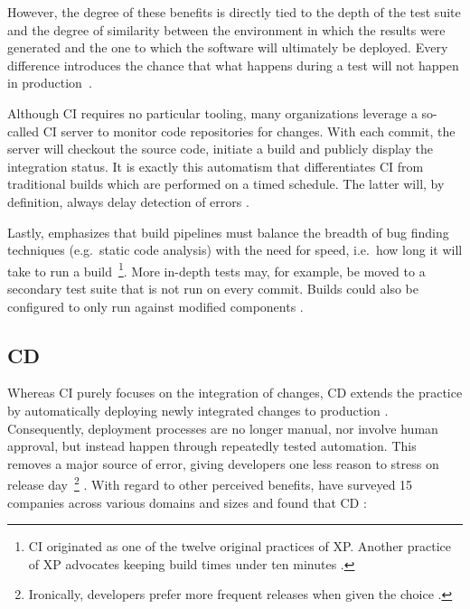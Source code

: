 \begin{appendices}
However, the degree of these benefits is directly tied to the depth of the test suite and the degree of similarity between the environment in which the results were generated and the one to which the software will ultimately be deployed. Every difference introduces the chance that what happens during a test will not happen in production~\cite[pp.~9,~12]{fowler2006continuous}.

Although \ac{CI} requires no particular tooling, many organizations leverage a so-called \ac{CI} server to monitor code repositories for changes. With each commit, the server will checkout the source code, initiate a build and publicly display the integration status. It is exactly this automatism that differentiates \ac{CI} from traditional builds which are performed on a timed schedule. The latter will, by definition, always delay detection of errors \cite[pp.~7,~10]{fowler2006continuous}.

Lastly, \citeauthor{fowler2006continuous} emphasizes that build pipelines must balance the breadth of bug finding techniques (e.g.~static code analysis) with the need for speed, i.e.~how long it will take to run a build~\footnote{\ac{CI} originated as one of the twelve original practices of \ac*{XP}. Another practice of \acs*{XP} advocates keeping build times under ten minutes \cite[pp.~2,~8]{fowler2006continuous}.}. More in-depth tests may, for example, be moved to a secondary test suite that is not run on every commit. Builds could also be configured to only run against modified components \cite[pp.~5,~8]{fowler2006continuous}.


\subsection{\acl{CD}}
\label{sec:continuous-deployment}

Whereas \ac{CI} purely focuses on the integration of changes, \ac{CD} extends the practice by automatically deploying newly integrated changes to production \cite[p.~64]{leppanen2015highways} \cite[p.~21]{savor2016continuous}. Consequently, deployment processes are no longer manual, nor involve human approval, but instead happen through repeatedly tested automation. This removes a major source of error, giving developers one less reason to stress on release day~\footnote{Ironically, developers prefer more frequent releases when given the choice \cite[p.~21]{savor2016continuous}.} \cite[pp.~79--80]{virmani2015understanding} \cite[p.~53]{chen2015continuous}. With regard to other perceived benefits, \citeauthor{leppanen2015highways} have surveyed 15 companies across various domains and sizes and found that \ac{CD} \cite[pp.~66--67]{leppanen2015highways}:


\end{appendices}
